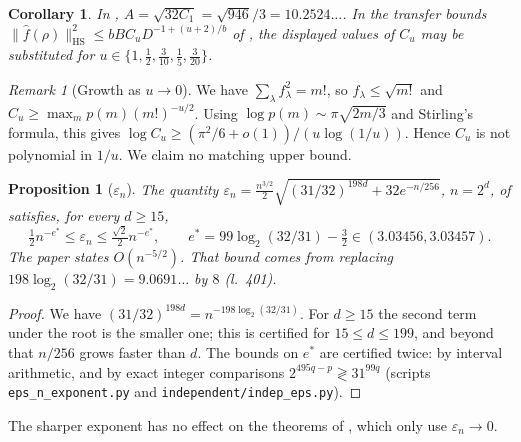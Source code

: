 \documentclass[11pt]{amsart}
\newtheorem{corollary}[theorem]{Corollary}
\newtheorem{proposition}[theorem]{Proposition}
\theoremstyle{remark}
\newtheorem{remark}[theorem]{Remark}
\begin{document}
\begin{corollary}
In \cite[Prop.~6.1, eq.~(h-12)]{oai-thorp}, $A=\sqrt{32C_1}=\sqrt{946}/3=10.2524\ldots$. In the transfer
bounds $\|\hat f(\rho)\|_{\mathrm{HS}}^2\le bBC_uD^{-1+(u+2)/b}$ of \cite[Thm.~1.1]{oai-transfer}, the
displayed values of $C_u$ may be substituted for $u\in\{1,\frac12,\frac3{10},\frac15,\frac3{20}\}$.
\end{corollary}

\begin{remark}[Growth as $u\to0$]
We have $\sum_\lambda f_\lambda^2=m!$, so $f_\lambda\le\sqrt{m!}$ and $C_u\ge\max_m p(m)(m!)^{-u/2}$. Using
$\log p(m)\sim\pi\sqrt{2m/3}$ and Stirling's formula, this gives
$\log C_u\ge(\pi^2/6+o(1))/(u\log(1/u))$. Hence $C_u$ is not polynomial in $1/u$. We claim no matching
upper bound.
\end{remark}

\begin{proposition}[$\varepsilon_n$]\label{prop:eps}
The quantity $\varepsilon_n=\frac{n^{3/2}}2\sqrt{(31/32)^{198d}+32e^{-n/256}}$, $n=2^d$, of
\cite[main.tex l.~381--389, eq.~(h-8)]{oai-thorp} satisfies, for every $d\ge15$,
\[\tfrac12n^{-e^*}\le\varepsilon_n\le\tfrac{\sqrt2}{2}n^{-e^*},\qquad e^*=99\log_2(32/31)-\tfrac32\in(3.03456,3.03457).\]
The paper states $O(n^{-5/2})$. That bound comes from replacing $198\log_2(32/31)=9.0691\ldots$ by $8$
(l.~401).
\end{proposition}
\begin{proof}
We have $(31/32)^{198d}=n^{-198\log_2(32/31)}$. For $d\ge15$ the second term under the root is the smaller
one; this is certified for $15\le d\le199$, and beyond that $n/256$ grows faster than $d$. The bounds on
$e^*$ are certified twice: by interval arithmetic, and by exact integer comparisons
$2^{495q-p}\gtrless31^{99q}$ (scripts \texttt{eps\_n\_exponent.py} and \texttt{independent/indep\_eps.py}).
\end{proof}
The sharper exponent has no effect on the theorems of \cite{oai-thorp}, which only use $\varepsilon_n\to0$.
\end{document}
